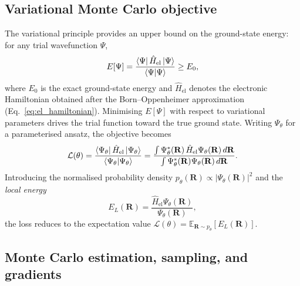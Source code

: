 \subsection{Variational Monte Carlo objective}

The variational principle provides an upper bound on the ground-state energy: for any trial wavefunction $\Psi$,
\begin{equation}
	E[\Psi] = \frac{\bra{\Psi} \hat{H}_{\text{el}}\ket{\Psi}}{\braket{\Psi}{\Psi}} \ge E_0,
\end{equation}
where $E_0$ is the exact ground-state energy and $\hat{H}_{\text{el}}$ denotes the electronic Hamiltonian obtained after the Born--Oppenheimer approximation (Eq.~\ref{eq:el_hamiltonian}). Minimising $E[\Psi]$ with respect to variational parameters drives the trial function toward the true ground state. Writing $\Psi_\theta$ for a parameterised ansatz, the objective becomes
\begin{equation}
	\mathcal{L}(\theta)
	=\frac{\bra{\Psi_{\theta}} \hat{H}_{\text{el}}\ket{\Psi_{\theta}}}{\braket{\Psi_{\theta}}{\Psi_{\theta}}}
	=\frac{\int \Psi_\theta^*(\mathbf{R})\,\hat{H}_{\text{el}}\Psi_\theta(\mathbf{R})\,d\mathbf{R}}{\int \Psi_\theta^*(\mathbf{R})\Psi_\theta(\mathbf{R})\,d\mathbf{R}}.
\end{equation}
Introducing the normalised probability density $p_\theta(\mathbf{R})\propto|\Psi_\theta(\mathbf{R})|^2$ and the \emph{local energy}
\begin{equation}
	E_L(\mathbf{R})=\frac{\hat{H}_{\text{el}}\Psi_\theta(\mathbf{R})}{\Psi_\theta(\mathbf{R})},
\end{equation}
the loss reduces to the expectation value $\mathcal{L}(\theta)=\mathbb{E}_{\mathbf{R}\sim p_\theta}[E_L(\mathbf{R})]$.

\subsection{Monte Carlo estimation, sampling, and gradients}

